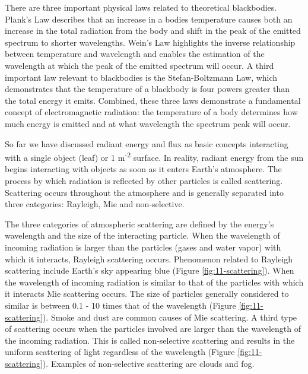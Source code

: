 \documentclass[
]{book}
\begin{document}
There are three important physical laws related to theoretical blackbodies. Plank's Law describes that an increase in a bodies temperature causes both an increase in the total radiation from the body and shift in the peak of the emitted spectrum to shorter wavelengths. Wein's Law highlights the inverse relationship between temperature and wavelength and enables the estimation of the wavelength at which the peak of the emitted spectrum will occur. A third important law relevant to blackbodies is the Stefan-Boltzmann Law, which demonstrates that the temperature of a blackbody is four powers greater than the total energy it emits. Combined, these three laws demonstrate a fundamental concept of electromagnetic radiation: the temperature of a body determines how much energy is emitted and at what wavelength the spectrum peak will occur.

So far we have discussed radiant energy and flux as basic concepts interacting with a single object (leaf) or 1 m\textsuperscript{-2} surface. In reality, radiant energy from the sun begins interacting with objects as soon as it enters Earth's atmosphere. The process by which radiation is reflected by other particles is called scattering. Scattering occurs throughout the atmosphere and is generally separated into three categories: Rayleigh, Mie and non-selective.

The three categories of atmospheric scattering are defined by the energy's wavelength and the size of the interacting particle. When the wavelength of incoming radiation is larger than the particles (gases and water vapor) with which it interacts, Rayleigh scattering occurs. Phenomenon related to Rayleigh scattering include Earth's sky appearing blue (Figure \ref{fig:11-scattering}). When the wavelength of incoming radiation is similar to that of the particles with which it interacts Mie scattering occurs. The size of particles generally considered to similar is between 0.1 - 10 times that of the wavelength (Figure \ref{fig:11-scattering}). Smoke and dust are common causes of Mie scattering. A third type of scattering occurs when the particles involved are larger than the wavelength of the incoming radiation. This is called non-selective scattering and results in the uniform scattering of light regardless of the wavelength (Figure \ref{fig:11-scattering}). Examples of non-selective scattering are clouds and fog.
\end{document}

